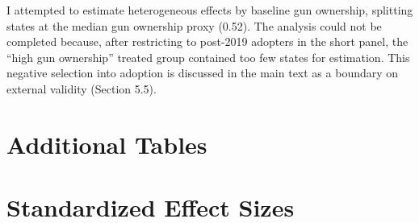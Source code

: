 \documentclass[12pt]{article}
\begin{document}
I attempted to estimate heterogeneous effects by baseline gun ownership, splitting states at the median gun ownership proxy (0.52). The analysis could not be completed because, after restricting to post-2019 adopters in the short panel, the ``high gun ownership'' treated group contained too few states for estimation. This negative selection into adoption is discussed in the main text as a boundary on external validity (Section 5.5).


\section{Additional Tables}




\section{Standardized Effect Sizes}
\label{sec:sde}
\end{document}
